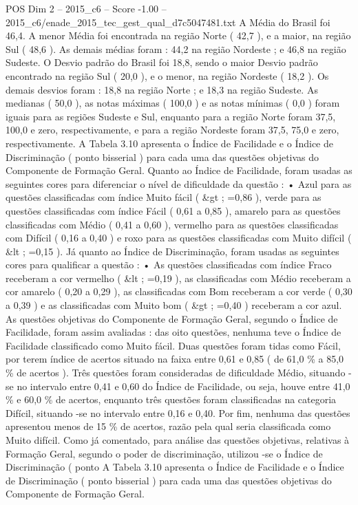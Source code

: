 \begin{textsample}{POS Dim 2 – 2015\_c6 – Score -1.00 – 2015\_c6/enade\_2015\_tec\_gest\_qual\_d7c5047481.txt}
A Média do Brasil foi 46,4.
A menor Média foi encontrada na região Norte ( 42,7 ), e a maior, na região Sul ( 48,6 ).
As demais médias foram : 44,2 na região Nordeste ; e 46,8 na região Sudeste.
O Desvio padrão do Brasil foi 18,8, sendo o maior Desvio padrão encontrado na região Sul ( 20,0 ), e o menor, na região Nordeste ( 18,2 ).
Os demais desvios foram : 18,8 na região Norte ; e 18,3 na região Sudeste.
As medianas ( 50,0 ), as notas máximas ( 100,0 ) e as notas mínimas ( 0,0 ) foram iguais para as regiões Sudeste e Sul, enquanto para a região Norte foram 37,5, 100,0 e zero, respectivamente, e para a região Nordeste foram 37,5, 75,0 e zero, respectivamente.
A Tabela 3.10 apresenta o Índice de Facilidade e o Índice de Discriminação ( ponto bisserial ) para cada uma das questões objetivas do Componente de Formação Geral.
Quanto ao Índice de Facilidade, foram usadas as seguintes cores para diferenciar o nível de dificuldade da questão : • Azul para as questões classificadas com índice Muito fácil ( \&gt ; =0,86 ), verde para as questões classificadas com índice Fácil ( 0,61 a 0,85 ), amarelo para as questões classificadas com Médio ( 0,41 a 0,60 ), vermelho para as questões classificadas com Difícil ( 0,16 a 0,40 ) e roxo para as questões classificadas com Muito difícil ( \&lt ; =0,15 ).
Já quanto ao Índice de Discriminação, foram usadas as seguintes cores para qualificar a questão : • As questões classificadas com índice Fraco receberam a cor vermelho ( \&lt ; =0,19 ), as classificadas com Médio receberam a cor amarelo ( 0,20 a 0,29 ), as classificadas com Bom receberam a cor verde ( 0,30 a 0,39 ) e as classificadas com Muito bom ( \&gt ; =0,40 ) receberam a cor azul.
As questões objetivas do Componente de Formação Geral, segundo o Índice de Facilidade, foram assim avaliadas : das oito questões, nenhuma teve o Índice de Facilidade classificado como Muito fácil.
Duas questões foram tidas como Fácil, por terem índice de acertos situado na faixa entre 0,61 e 0,85 ( de 61,0 \% a 85,0 \% de acertos ).
Três questões foram consideradas de dificuldade Médio, situando -se no intervalo entre 0,41 e 0,60 do Índice de Facilidade, ou seja, houve entre 41,0 \% e 60,0 \% de acertos, enquanto três questões foram classificadas na categoria Difícil, situando -se no intervalo entre 0,16 e 0,40.
Por fim, nenhuma das questões apresentou menos de 15 \% de acertos, razão pela qual seria classificada como Muito difícil.
Como já comentado, para análise das questões objetivas, relativas à Formação Geral, segundo o poder de discriminação, utilizou -se o Índice de Discriminação ( ponto A Tabela 3.10 apresenta o Índice de Facilidade e o Índice de Discriminação ( ponto bisserial ) para cada uma das questões objetivas do Componente de Formação Geral.

\end{textsample}
